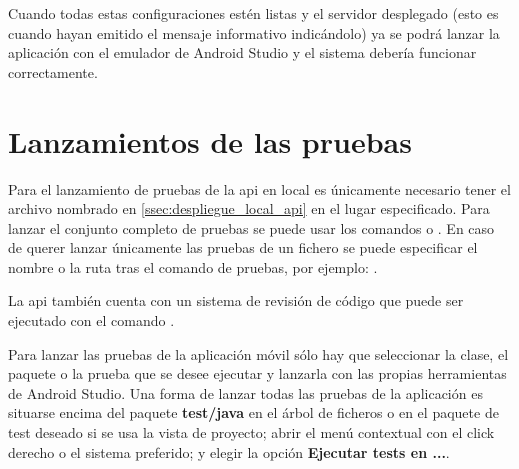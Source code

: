
Cuando todas estas configuraciones estén listas y el servidor desplegado (esto es cuando hayan emitido el mensaje informativo indicándolo) ya se podrá lanzar la aplicación con el emulador de Android Studio y el sistema debería funcionar correctamente.

\section{Lanzamientos de las pruebas}

Para el lanzamiento de pruebas de la \acrshort{api} en local es únicamente necesario tener el archivo  nombrado en \ref{ssec:despliegue_local_api}  en el lugar especificado. Para lanzar el conjunto completo de pruebas se puede usar los comandos  o . En caso de querer lanzar únicamente las pruebas de un fichero se puede especificar el nombre o la ruta tras el comando de pruebas, por ejemplo: .

La \acrshort{api} también cuenta con un sistema de revisión de código que puede ser ejecutado con el comando .

Para lanzar las pruebas de la aplicación móvil sólo hay que seleccionar la clase, el paquete o la prueba que se desee ejecutar y lanzarla con las propias herramientas de Android Studio. Una forma de lanzar todas las pruebas de la aplicación es situarse encima del paquete \textbf{test/java} en el árbol de ficheros o en el paquete de test deseado si se usa la vista de proyecto; abrir el menú contextual con el click derecho o el sistema preferido; y elegir la opción \textbf{Ejecutar tests en ...}.